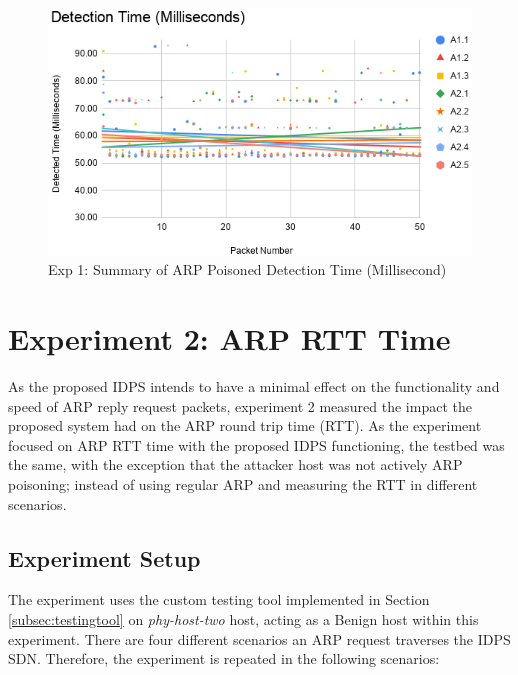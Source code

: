 \documentclass[12pt, oneside]{book}
\begin{document}
\begin{figure}[H]
	\centering
	\includegraphics[scale=0.63]{images/AllARPDet.png}
	\caption{Exp 1: Summary of ARP Poisoned Detection Time (Millisecond)}
	\label{fig:rttexpset}
\end{figure}




\newpage
\section{Experiment 2: ARP RTT Time}
As the proposed IDPS intends to have a minimal effect on the functionality and speed of ARP reply request packets,
experiment 2 measured the impact the proposed system had on the ARP round trip time (RTT). As the experiment focused on
ARP RTT time with the proposed IDPS functioning, the testbed was the same, with the exception that the attacker host was
not actively ARP poisoning; instead of using regular ARP and measuring the RTT in different scenarios.


\subsection{Experiment Setup}
The experiment uses the custom testing tool implemented in Section \ref{subsec:testingtool} on \emph{phy-host-two} host,
acting as a Benign host within this experiment. There are four different scenarios an ARP request traverses the IDPS SDN. Therefore,
the experiment is repeated in the following scenarios:
\end{document}
